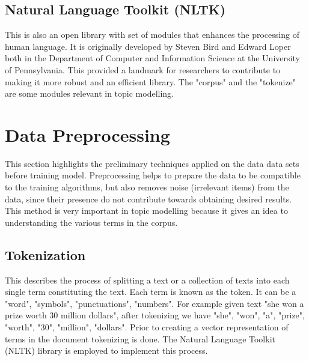\subsection{Natural  Language Toolkit (NLTK)}

This is also an open library with set of modules that enhances the processing of human language. It is originally developed by Steven Bird and Edward Loper both in  the Department of Computer and Information Science at the University of Pennsylvania. This provided a landmark for researchers to contribute to making it more robust and an efficient library. The "corpus" and the "tokenize" are some modules relevant in topic modelling.
\section{Data Preprocessing}
\begin{flushleft}
This section highlights the preliminary techniques applied on the data data sets before training model. Preprocessing helps to prepare the data to be compatible to the training algorithms, but also removes noise (irrelevant items) from the data, since their presence do not contribute towards obtaining desired results. This method is very important in topic modelling because it gives an idea to understanding the various terms in the corpus.
\end{flushleft}
\subsection{Tokenization}
\begin{flushleft}
This describes the process of splitting  a text or a collection of texts  into each single term constituting the text. Each term is known as the token. It can be a "word", "symbols", "punctuations", "numbers". For example given text "she won a prize worth 30 million dollars", after tokenizing we have "she", "won", "a", "prize", "worth", "30", "million", "dollars". Prior to creating a vector representation of terms in the document tokenizing is done. The Natural Language Toolkit (NLTK) library is employed to implement this process.
\end{flushleft}
